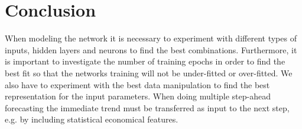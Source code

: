 \section{Conclusion}
When modeling the network it is necessary to experiment with different types of inputs, hidden layers and neurons to find the best combinations. Furthermore, it is important to investigate the number of training epochs in order to find the best fit so that the networks training will not be under-fitted or over-fitted. We also have to experiment with the best data manipulation to find the best representation for the input parameters. When doing multiple step-ahead forecasting the immediate trend must be transferred as input to the next step, e.g. by including statistical economical features.

 